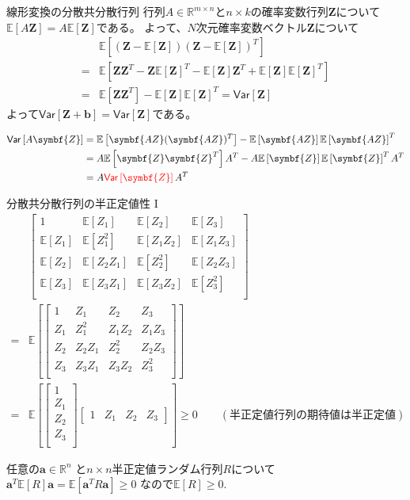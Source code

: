 \documentclass[lualatex,handout]{beamer}
\newcommand{\mycolor}[2]{%
  \begingroup
  \colorlet{currentcolor}{.}%
  \color{#1}#2%
  \color{currentcolor}%
  \endgroup
}
\newcommand{\emm}[1]{\mycolor{red}{#1}}
\newcommand{\expt}[1]{\mathbb{E}\left[#1\right]}
\newcommand{\vc}[1]{\mathsf{Var}\left[#1\right]}
\theoremstyle{definition}
\begin{document}
\begin{frame}{線形変換の分散共分散行列}
行列$A\in\mathbb{R}^{m\times n}$と$n\times k$の確率変数行列$\symbf{Z}$について$\expt{A\symbf{Z}}=A\expt{\symbf{Z}}$である。
よって、$N$次元確率変数ベクトル$\symbf{Z}$について
\begin{align*}
&\expt{(\symbf{Z} - \expt{\symbf{Z}})(\symbf{Z} - \expt{\symbf{Z}})^T}\\
=&\expt{\symbf{Z}\symbf{Z}^T - \symbf{Z}\expt{\symbf{Z}}^T - \expt{\symbf{Z}}\symbf{Z}^T + \expt{\symbf{Z}}\expt{\symbf{Z}}^T}\\
=& \expt{\symbf{Z} \symbf{Z}^T} - \expt{\symbf{Z}}\expt{\symbf{Z}}^T
=\vc{\symbf{Z}}
\end{align*}
よって$\vc{\symbf{Z}+\symbf{b}}=\vc{\symbf{Z}}$である。

\vspace{1em}
\begin{align*}
\vc{A\symbf{Z}}&=\expt{\symbf{AZ} (\symbf{AZ})^T} - \expt{\symbf{AZ}}\expt{\symbf{AZ}}^T\\
&=A\expt{\symbf{Z} \symbf{Z}^T}A^T - A\expt{\symbf{Z}}\expt{\symbf{Z}}^TA^T\\
&=A\emm{\vc{\symbf{Z}}}A^T
\end{align*}
\end{frame}

\begin{frame}{分散共分散行列の半正定値性 I}
\small
\begin{align*}
&
\begin{bmatrix}
1&\expt{Z_1}&\expt{Z_2}&\expt{Z_3}\\
\expt{Z_1}&\expt{Z_1^2}&\expt{Z_1Z_2}&\expt{Z_1Z_3}\\
\expt{Z_2}&\expt{Z_2Z_1}&\expt{Z_2^2}&\expt{Z_2Z_3}\\
\expt{Z_3}&\expt{Z_3Z_1}&\expt{Z_3Z_2}&\expt{Z_3^2}\\
\end{bmatrix}\\
=&
\expt{
\begin{bmatrix}
1&Z_1&Z_2&Z_3\\
Z_1&Z_1^2&Z_1Z_2&Z_1Z_3\\
Z_2&Z_2Z_1&Z_2^2&Z_2Z_3\\
Z_3&Z_3Z_1&Z_3Z_2&Z_3^2\\
\end{bmatrix}}\\
=&
\expt{
\begin{bmatrix}
1\\
Z_1\\
Z_2\\
Z_3\\
\end{bmatrix}
\begin{bmatrix}
1&
Z_1&
Z_2&
Z_3
\end{bmatrix}}\ge 0\qquad (\text{半正定値行列の期待値は半正定値})
\end{align*}

任意の$\symbf{a}\in\mathbb{R}^n$ と$n\times n$半正定値ランダム行列$R$について
$\symbf{a}^T \expt{R}\symbf{a} = \expt{\symbf{a}^TR\symbf{a}}\ge 0$
なので$\expt{R}\ge0$.
\end{frame}
\end{document}

